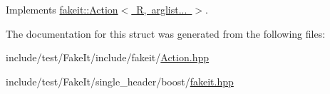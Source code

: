 Implements \mbox{\hyperlink{structfakeit_1_1Action_a0b9ab2c889a54c07dcaa8efc101a5cbc}{fakeit\+::\+Action$<$ R, arglist... $>$}}.



The documentation for this struct was generated from the following files\+:\begin{DoxyCompactItemize}
\item 
include/test/\+Fake\+It/include/fakeit/\mbox{\hyperlink{Action_8hpp}{Action.\+hpp}}\item 
include/test/\+Fake\+It/single\+\_\+header/boost/\mbox{\hyperlink{single__header_2boost_2fakeit_8hpp}{fakeit.\+hpp}}\end{DoxyCompactItemize}
